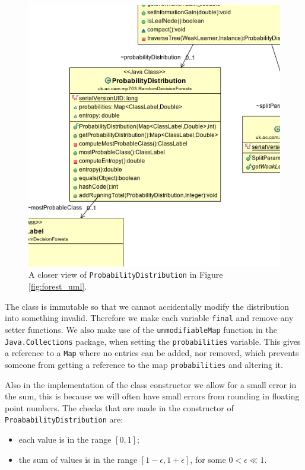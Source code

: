 \documentclass[12pt,twoside,notitlepage]{report}
\begin{document}
                \begin{figure}[H]
                    \centering
                    \includegraphics[scale=0.5]{ProbabilityDistribution_Forest_UML}
                    \caption{A closer view of \texttt{ProbabilityDistribution} in Figure \ref{fig:forest_uml}.}
                    \label{fig:prob_dist_uml}
                \end{figure}

                The class is immutable so that we cannot accidentally modify the distribution into something 
                invalid. Therefore we make each variable \texttt{final} and remove any setter functions. 
                We also make use of the \texttt{unmodifiableMap} function in the \texttt{Java.Collections} 
                package, when setting the \texttt{probabilities} variable. This gives a reference to a \texttt{Map} 
                where no entries can be added, nor removed, which prevents someone from getting a reference to the map
                \texttt{probabilities} and altering it.

                Also in the implementation of the class constructor we allow for a small error in the sum, this is 
                because we will often have small errors from rounding in floating point numbers. The checks that 
                are made in the constructor of \texttt{ProababilityDistribution} are:
                \begin{itemize}
                    \item 
                        each value is in the range $[0,1]$;
                    \item 
                        the sum of values is in the range $[1-\epsilon,1+\epsilon]$, for some $0 < \epsilon \ll 1$.
                \end{itemize}
\end{document}
